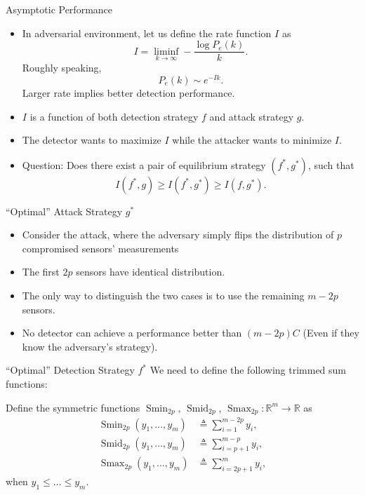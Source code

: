 \documentclass[10pt]{beamer}
\newcommand{\tikzdir}[1]{#1.tikz}
\newcommand{\inputtikz}[1]{}}
\DeclareMathOperator{\Smin}{Smin}
\DeclareMathOperator{\Smid}{Smid}
\DeclareMathOperator{\Smax}{Smax}
\begin{document}
\begin{frame}{Asymptotic Performance}
  \begin{itemize}
  \item In adversarial environment, let us define the rate function $I$ as
    \begin{displaymath}
      I = \liminf_{k\rightarrow\infty} -\frac{\log P_e(k)}{k}.
    \end{displaymath}
    Roughly speaking, 
    \begin{displaymath}
      P_e(k)\sim e^{-Ik}. 
    \end{displaymath}
    Larger rate implies better detection performance.
  \item  $I$ is a function of both detection strategy $f$ and attack strategy $g$.
  \item The detector wants to maximize $I$ while the attacker wants to minimize $I$.
  \item Question: Does there exist a pair of equilibrium strategy $(f^*,g^*)$, such that
    \begin{displaymath}
      I(f^*,g)\geq I(f^*,g^*) \geq I(f,g^*).	
    \end{displaymath}
  \end{itemize}
\end{frame}

\begin{frame}{``Optimal'' Attack Strategy $g^*$}
  \begin{itemize}
  \item Consider the attack, where the adversary simply flips the distribution of $p$ compromised sensors' measurements
    \begin{center}
      \inputtikz{attack}
    \end{center}
  \item The first $2p$ sensors have identical distribution.
  \item The only way to distinguish the two cases is to use the remaining $m-2p$ sensors.
  \item No detector can achieve a performance better than $(m-2p)C$ (Even if they know the adversary's strategy).
  \end{itemize}
\end{frame}

\begin{frame}{``Optimal'' Detection Strategy $f^*$}
  We need to define the following trimmed sum functions:
  \begin{definition}
    Define the symmetric functions $\Smin_{2p},\,\Smid_{2p},\,\Smax_{2p}:\mathbb R^{m}\rightarrow \mathbb R$ as  
    \begin{align*}
      \Smin_{2p}(y_1,\ldots,y_m) &\triangleq \sum_{i=1}^{m-2p}y_i,\\
      \Smid_{2p}(y_1,\ldots,y_m) &\triangleq \sum_{i=p+1}^{m-p}y_i,\\
      \Smax_{2p}(y_1,\ldots,y_m) &\triangleq \sum_{i=2p+1}^{m}y_i,
    \end{align*}
    when $y_1\leq \dots\leq y_m$.
  \end{definition}
\end{frame}
\end{document}
